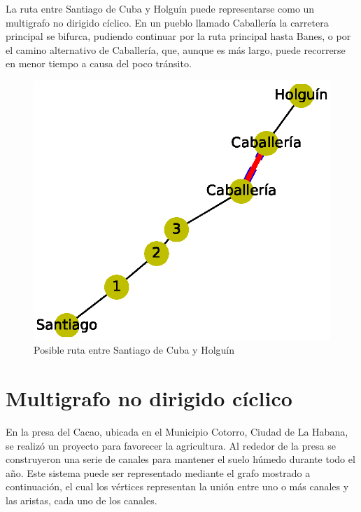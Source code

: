 \documentclass{article}
\begin{document}
La ruta entre Santiago de Cuba y Holguín puede representarse  como un multigrafo no dirigido cíclico. En un pueblo llamado Caballería la carretera principal se bifurca, pudiendo continuar por la ruta principal hasta Banes, o por el camino alternativo de Caballería, que, aunque es más largo, puede recorrerse en menor tiempo a causa del poco tránsito.


\begin{figure}
  \includegraphics[width=.8\columnwidth]{7.eps}
  \caption{Posible ruta entre Santiago de Cuba y Holguín}
  \label{fig:7}
\end{figure}

\section{Multigrafo no dirigido cíclico}

En la presa del Cacao, ubicada en el Municipio Cotorro, Ciudad de La Habana, se realizó un proyecto para favorecer la agricultura. Al rededor de la presa se construyeron una serie de canales para mantener el suelo húmedo durante todo el año.
Este sistema puede ser representado mediante el grafo mostrado a continuación, el cual los vértices representan la unión entre uno o más canales y las aristas, cada uno de los canales.
\end{document}
